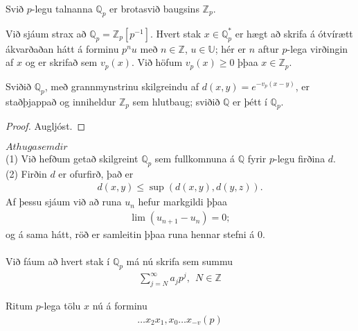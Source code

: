 \begin{skilgr}
 Svið $p$-legu talnanna $\mathbb{Q}_p$ er brotasvið baugsins $\mathbb{Z}_p$.
\end{skilgr}
Við sjáum strax að $\mathbb{Q}_p = \mathbb{Z}_p[p^{-1}]$. Hvert stak 
$x \in \mathbb{Q}_p^*$ er hægt að skrifa á ótvírætt ákvarðaðan hátt á forminu 
$p^nu$ með $n \in \mathbb{Z}$, $u \in \mathbb{U}$; hér er $n$ aftur $p$-lega 
virðingin af $x$ og er skrifað sem $v_p(x)$. Við höfum $v_p(x) \geq 0$ þþaa 
$x \in \mathbb{Z}_p$. 
\begin{setn}
 Sviðið $\mathbb{Q}_p$, með grannmynstrinu skilgreindu af 
$d(x,y) = e^{-v_p(x-y)}$, er staðþjappað og inniheldur $\mathbb{Z}_p$ sem 
hlutbaug; sviðið $\mathbb{Q}$ er þétt í $\mathbb{Q}_p$.
\end{setn}
\begin{proof}
 Augljóst.
\end{proof}
$Athugasemdir$\\
(1) Við hefðum getað skilgreint $\mathbb{Q}_p$ sem fullkomnuna á $\mathbb{Q}$ 
fyrir $p$-legu firðina $d$.\\
(2) Firðin $d$ er ofurfirð, það er 
\begin{align*}
 d(x,y) \leq \sup (d(x,y),d(y,z)).
\end{align*}
Af þessu sjáum við að runa $u_n$ hefur markgildi þþaa 
\begin{align*}
 \lim(u_{n+1} - u_n) = 0;
\end{align*}
og á sama hátt, röð er samleitin þþaa runa hennar stefni á 0.\\
\\Við fáum að hvert stak í $\mathbb{Q}_p$ má nú skrifa sem summu
\begin{align*}
 \sum_{j=N}^{\infty} a_jp^j,\ \ N \in \mathbb{Z}
\end{align*}
\begin{Rit}
Ritum $p$-lega tölu $x$ nú á forminu
\begin{align*}
 \ldots x_2 x_1,x_0 \ldots x_{-v} (p)
\end{align*}
\end{Rit}
